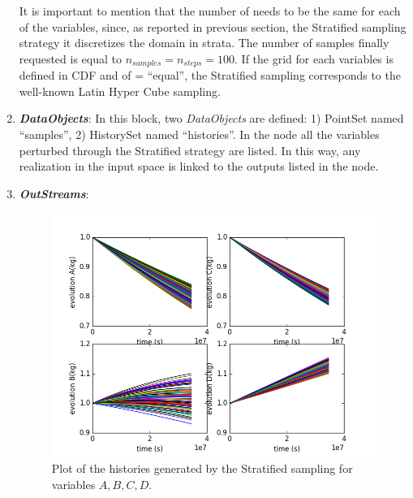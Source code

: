 \begin{enumerate}
  It is important to mention that the number of  needs to be the same for each of the variables,
  since, as reported in previous section, the Stratified sampling strategy it discretizes the domain in strata.
  The number of samples finally requested is equal to $n_{samples} = n_{steps} = 100$.
  If the grid for each variables is defined in CDF and of   = ``equal'', the Stratified
  sampling corresponds to the well-known Latin Hyper Cube sampling.
   \item \textbf{\textit{DataObjects}}:
  In this block, two \textit{DataObjects} are defined: 1) PointSet named
  ``samples'', 2) HistorySet named ``histories''.
  In the  node all the variables
  perturbed through the Stratified strategy are listed. In this way, any
  realization in the input space is linked to the outputs listed in  the
   node.
   \item \textbf{\textit{OutStreams}}:
 \begin{figure}[h!]
  \centering
  \includegraphics[scale=0.7]{../../tests/framework/user_guide/ForwardSamplingStrategies/gold/RunDir/Stratified/1-historyPlot_line-line-line-line.png}
  \caption{Plot of the histories generated by the Stratified sampling for variables $A,B,C,D$.}
  \label{fig:historiesStratifiedPlotLine}
 \end{figure}

\end{enumerate}

